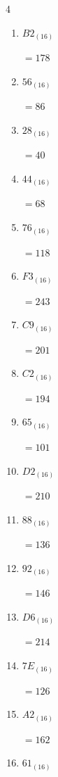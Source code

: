 \begin{multicols}{4}
\begin{enumerate}
        $=243$

  \item $B2_{(16)}$

        $=178$

  \item $56_{(16)}$

        $=86$

  \item $28_{(16)}$

        $=40$

\columnbreak %

\resetques

  \item $44_{(16)}$

        $=68$

  \item $76_{(16)}$

        $=118$

  \item $F3_{(16)}$

        $=243$

  \item $C9_{(16)}$

        $=201$

  \item $C2_{(16)}$

        $=194$

  \item $65_{(16)}$

        $=101$

  \item $D2_{(16)}$

        $=210$

  \item $88_{(16)}$

        $=136$

  \item $92_{(16)}$

        $=146$

  \item $D6_{(16)}$

        $=214$

  \item $7E_{(16)}$

        $=126$

  \item $A2_{(16)}$

        $=162$

  \item $61_{(16)}$


\end{enumerate}
\end{multicols}
